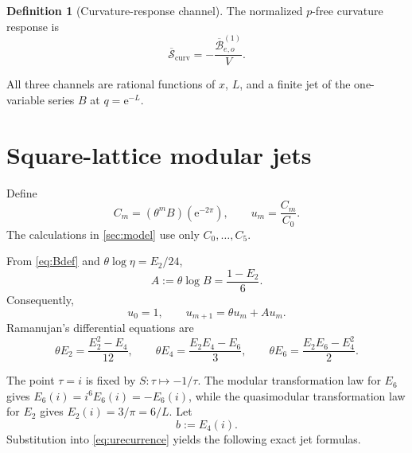 \documentclass[11pt]{article}
\theoremstyle{definition}
\newtheorem{definition}[theorem]{Definition}
\theoremstyle{remark}
\newcommand{\e}{\mathrm{e}}
\newcommand{\cB}{\mathcal{B}}
\newcommand{\bSc}{\overline{\mathcal{S}}_{\mathrm{curv}}}
\begin{document}
\begin{definition}[Curvature-response channel]\label{def:curvchannel}
The normalized \(p\)-free curvature response is
\begin{equation}\label{eq:Scurvdef}
 \bSc=-\frac{\overline{\cB}^{(1)}_{e,o}}{V}.
\end{equation}
\end{definition}

All three channels are rational functions of \(x\), \(L\), and a finite jet of the one-variable series \(B\) at \(q=\e^{-L}\).

\section{Square-lattice modular jets}\label{sec:modularjets}

Define
\begin{equation}\label{eq:Cm}
 C_m=(\theta^mB)(\e^{-2\pi}),
 \qquad
 u_m=\frac{C_m}{C_0}.
\end{equation}
The calculations in \cref{sec:model} use only \(C_0,\ldots,C_5\).

From \eqref{eq:Bdef} and \(\theta\log\eta=E_2/24\),
\begin{equation}\label{eq:A}
 A:=\theta\log B=\frac{1-E_2}{6}.
\end{equation}
Consequently,
\begin{equation}\label{eq:urecurrence}
 u_0=1,
 \qquad
 u_{m+1}=\theta u_m+A u_m.
\end{equation}
Ramanujan's differential equations are
\begin{equation}\label{eq:Ramanujan}
 \theta E_2=\frac{E_2^2-E_4}{12},
 \qquad
 \theta E_4=\frac{E_2E_4-E_6}{3},
 \qquad
 \theta E_6=\frac{E_2E_6-E_4^2}{2}.
\end{equation}

The point \(\tau=i\) is fixed by \(S:\tau\mapsto-1/\tau\). The modular transformation law for \(E_6\) gives \(E_6(i)=i^6E_6(i)=-E_6(i)\), while the quasimodular transformation law for \(E_2\) gives \(E_2(i)=3/\pi=6/L\). Let
\begin{equation}\label{eq:bdef}
 b:=E_4(i).
\end{equation}
Substitution into \eqref{eq:urecurrence} yields the following exact jet formulas.
\end{document}
